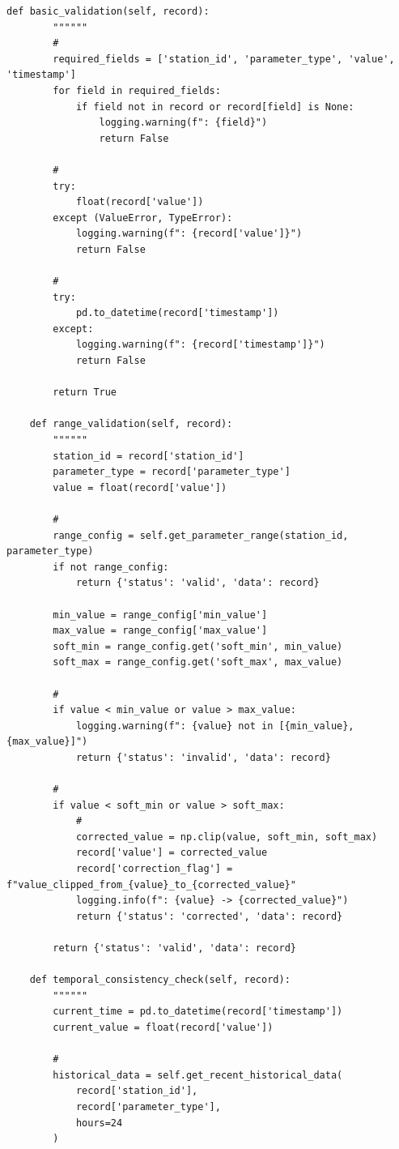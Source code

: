 \begin{lstlisting}[style=python]
    def basic_validation(self, record):
        """"""
        # 
        required_fields = ['station_id', 'parameter_type', 'value', 'timestamp']
        for field in required_fields:
            if field not in record or record[field] is None:
                logging.warning(f": {field}")
                return False
        
        # 
        try:
            float(record['value'])
        except (ValueError, TypeError):
            logging.warning(f": {record['value']}")
            return False
        
        # 
        try:
            pd.to_datetime(record['timestamp'])
        except:
            logging.warning(f": {record['timestamp']}")
            return False
        
        return True
    
    def range_validation(self, record):
        """"""
        station_id = record['station_id']
        parameter_type = record['parameter_type']
        value = float(record['value'])
        
        # 
        range_config = self.get_parameter_range(station_id, parameter_type)
        if not range_config:
            return {'status': 'valid', 'data': record}
        
        min_value = range_config['min_value']
        max_value = range_config['max_value']
        soft_min = range_config.get('soft_min', min_value)
        soft_max = range_config.get('soft_max', max_value)
        
        # 
        if value < min_value or value > max_value:
            logging.warning(f": {value} not in [{min_value}, {max_value}]")
            return {'status': 'invalid', 'data': record}
        
        # 
        if value < soft_min or value > soft_max:
            # 
            corrected_value = np.clip(value, soft_min, soft_max)
            record['value'] = corrected_value
            record['correction_flag'] = f"value_clipped_from_{value}_to_{corrected_value}"
            logging.info(f": {value} -> {corrected_value}")
            return {'status': 'corrected', 'data': record}
        
        return {'status': 'valid', 'data': record}
    
    def temporal_consistency_check(self, record):
        """"""
        current_time = pd.to_datetime(record['timestamp'])
        current_value = float(record['value'])
        
        # 
        historical_data = self.get_recent_historical_data(
            record['station_id'], 
            record['parameter_type'],
            hours=24
        )
        

\end{lstlisting}
